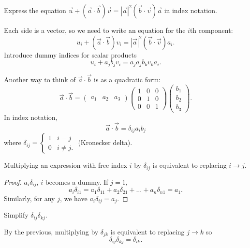 \documentclass[10pt, a4paper]{article}
\begin{document}
\begin{example}
    Express the equation $\vec{u} + (\vec{a} \cdot \vec{b})\vec{v} = |\vec{a}| ^ 2(\vec{b} \cdot \vec{v})\vec{a}$ in index notation.

    Each side is a vector,
    so we need to write an equation for the $i$th component:
    \[
    u_i + (\vec{a} \cdot \vec{b})v_i = |\vec{a}| ^ 2(\vec{b} \cdot \vec{v})a_i.
    \]
    Introduce dummy indices for scalar products
    \[
    u_i + a_jb_jv_i = a_ja_jb_kv_ka_i.
    \]
\end{example}

Another way to think of $\vec{a} \cdot \vec{b}$ is as a quadratic form:
\[
\vec{a} \cdot \vec{b} = \begin{pmatrix}
    a_1 & a_2 & a_3
\end{pmatrix} \begin{pmatrix}
    1 & 0 & 0 \\ 0 & 1 & 0 \\ 0 & 0 & 1
\end{pmatrix}\begin{pmatrix}
    b_1 \\ b_2 \\ b_3
\end{pmatrix}.
\]
In index notation,
\[
\vec{a} \cdot \vec{b} = \delta_{ij}a_ib_j
\]
where $\delta_{ij} = \begin{cases}
    1 & i = j \\
    0 & i \neq j.
\end{cases}$
(Kronecker delta).

\begin{proposition}
    Multiplying an expression with free index $i$ by $\delta_{ij}$ is equivalent to replacing $i \to j$.

    \begin{proof}
        $a_i\delta_{ij}$,
        $i$ becomes a dummy.
        If $j = 1$,
        \[
        a_i\delta_{i1} = a_1\delta_{11} + a_2\delta_{21} + \dotsc + a_n\delta_{n1} = a_1.
        \]
        Similarly,
        for any $j$,
        we have $a_i\delta_{ij} = a_j$.
    \end{proof}
\end{proposition}

\begin{example}
    Simplify $\delta_{ij}\delta_{kj}$.

    \begin{solution}
        By the previous,
        multiplying by $\delta_{jk}$ is equivalent to replacing $j \to k$ so
        \[
        \delta_{ij}\delta_{kj} = \delta_{ik}.
        \]
    \end{solution}
\end{example}
\end{document}

